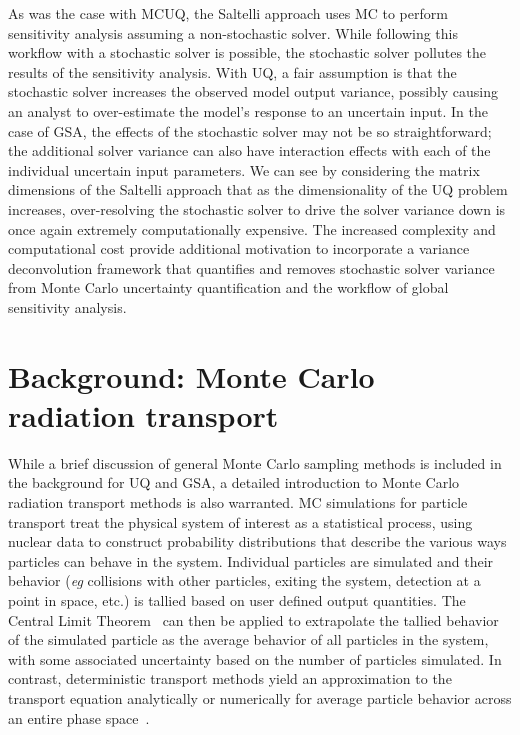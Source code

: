 As was the case with MCUQ, the Saltelli approach uses MC to perform sensitivity analysis assuming a non-stochastic solver. While following this workflow with a stochastic solver is possible, the stochastic solver pollutes the results of the sensitivity analysis. With UQ, a fair assumption is that the stochastic solver increases the observed model output variance, possibly causing an analyst to over-estimate the model's response to an uncertain input. In the case of GSA, the effects of the stochastic solver may not be so straightforward; the additional solver variance can also have interaction effects with each of the individual uncertain input parameters. We can see by considering the matrix dimensions of the Saltelli approach that as the dimensionality of the UQ problem increases, over-resolving the stochastic solver to drive the solver variance down is once again extremely computationally expensive. 
The increased complexity and computational cost provide additional motivation to incorporate a variance deconvolution framework that quantifies and removes stochastic solver variance from Monte Carlo uncertainty quantification and the workflow of global sensitivity analysis.


\section{Background: Monte Carlo radiation transport}\label{sec:background-mcrt}
While a brief discussion of general Monte Carlo sampling methods is included in the background for UQ and GSA, a detailed introduction to Monte Carlo radiation transport methods is also warranted. MC simulations for particle transport treat the physical system of interest as a statistical process, using nuclear data to construct probability distributions that describe the various ways particles can behave in the system. Individual particles are simulated and their behavior (\textit{eg} collisions with other particles, exiting the system, detection at a point in space, etc.) is tallied based on user defined output quantities. The Central Limit Theorem~\cite{Larsen-statistics} can then be applied to extrapolate the tallied behavior of the simulated particle as the average behavior of all particles in the system, with some associated uncertainty based on the number of particles simulated. In contrast,  deterministic transport methods yield an approximation to the transport equation analytically or numerically for average particle behavior across an entire phase space~\cite{mcnp}. 

